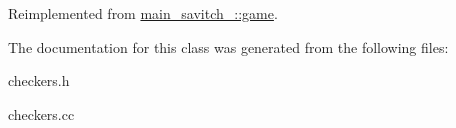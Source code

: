 Reimplemented from \hyperlink{classmain__savitch__14_1_1game_a2f0d5338c12bd98d52fe2383ece5c45e}{main\+\_\+savitch\+\_\+::game}.



The documentation for this class was generated from the following files\+:\begin{DoxyCompactItemize}
\item 
checkers.\+h\item 
checkers.\+cc\end{DoxyCompactItemize}
